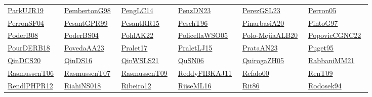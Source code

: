 \begin{longtable}{*{6}{l}}
\href{../works/ParkUJR19.pdf}{ParkUJR19}~\cite{ParkUJR19} & \href{../works/PembertonG98.pdf}{PembertonG98}~\cite{PembertonG98} & \href{../}{PengLC14}~\cite{PengLC14} & \href{../works/PenzDN23.pdf}{PenzDN23}~\cite{PenzDN23} & \href{../works/PerezGSL23.pdf}{PerezGSL23}~\cite{PerezGSL23} & \href{../}{Perron05}~\cite{Perron05}\\ 
\href{../works/PerronSF04.pdf}{PerronSF04}~\cite{PerronSF04} & \href{../works/PesantGPR99.pdf}{PesantGPR99}~\cite{PesantGPR99} & \href{../works/PesantRR15.pdf}{PesantRR15}~\cite{PesantRR15} & \href{../}{PeschT96}~\cite{PeschT96} & \href{../}{PinarbasiA20}~\cite{PinarbasiA20} & \href{../}{PintoG97}~\cite{PintoG97}\\ 
\href{../works/PoderB08.pdf}{PoderB08}~\cite{PoderB08} & \href{../works/PoderBS04.pdf}{PoderBS04}~\cite{PoderBS04} & \href{../works/PohlAK22.pdf}{PohlAK22}~\cite{PohlAK22} & \href{../works/PolicellaWSO05.pdf}{PolicellaWSO05}~\cite{PolicellaWSO05} & \href{../works/Polo-MejiaALB20.pdf}{Polo-MejiaALB20}~\cite{Polo-MejiaALB20} & \href{../works/PopovicCGNC22.pdf}{PopovicCGNC22}~\cite{PopovicCGNC22}\\ 
\href{../works/PourDERB18.pdf}{PourDERB18}~\cite{PourDERB18} & \href{../works/PovedaAA23.pdf}{PovedaAA23}~\cite{PovedaAA23} & \href{../works/Pralet17.pdf}{Pralet17}~\cite{Pralet17} & \href{../works/PraletLJ15.pdf}{PraletLJ15}~\cite{PraletLJ15} & \href{../works/PrataAN23.pdf}{PrataAN23}~\cite{PrataAN23} & \href{../works/Puget95.pdf}{Puget95}~\cite{Puget95}\\ 
\href{../works/QinDCS20.pdf}{QinDCS20}~\cite{QinDCS20} & \href{../works/QinDS16.pdf}{QinDS16}~\cite{QinDS16} & \href{../works/QinWSLS21.pdf}{QinWSLS21}~\cite{QinWSLS21} & \href{../works/QuSN06.pdf}{QuSN06}~\cite{QuSN06} & \href{../works/QuirogaZH05.pdf}{QuirogaZH05}~\cite{QuirogaZH05} & \href{../}{RabbaniMM21}~\cite{RabbaniMM21}\\ 
\href{../}{RasmussenT06}~\cite{RasmussenT06} & \href{../}{RasmussenT07}~\cite{RasmussenT07} & \href{../}{RasmussenT09}~\cite{RasmussenT09} & \href{../works/ReddyFIBKAJ11.pdf}{ReddyFIBKAJ11}~\cite{ReddyFIBKAJ11} & \href{../works/Refalo00.pdf}{Refalo00}~\cite{Refalo00} & \href{../works/RenT09.pdf}{RenT09}~\cite{RenT09}\\ 
\href{../works/RendlPHPR12.pdf}{RendlPHPR12}~\cite{RendlPHPR12} & \href{../works/RiahiNS018.pdf}{RiahiNS018}~\cite{RiahiNS018} & \href{../}{Ribeiro12}~\cite{Ribeiro12} & \href{../works/RiiseML16.pdf}{RiiseML16}~\cite{RiiseML16} & \href{../works/Rit86.pdf}{Rit86}~\cite{Rit86} & \href{../}{Rodosek94}~\cite{Rodosek94}\\ 

\end{longtable}
